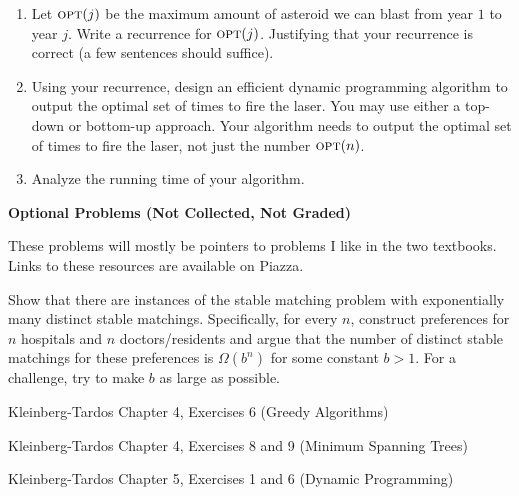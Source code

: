 \documentclass[11pt]{article}
\theoremstyle{definition}
\begin{document}
\begin{enumerate}[leftmargin=0pt, itemsep=3ex]
\begin{enumerate}[leftmargin=0pt, itemsep=3ex]
    \item Let $\textsc{opt}(j)$ be the maximum amount of asteroid we can blast from year $1$ to year $j$.  Write a recurrence for $\textsc{opt}(j)$. Justifying that your recurrence is correct (a few sentences should suffice).

    \item Using your recurrence, design an efficient dynamic programming algorithm to output the optimal set of times to fire the laser.  You may use either a top-down or bottom-up approach.  Your algorithm needs to output the optimal set of times to fire the laser, not just the number $\textsc{opt}(n)$.

    \item Analyze the running time of your algorithm.
    \end{enumerate}
\end{enumerate}

\noindent\textbf{\color{red} \Large Optional Problems (Not Collected, Not Graded)}

\medskip
\noindent These problems will mostly be pointers to problems I like in the two textbooks.  Links to these resources are available on Piazza.

\begin{enumerate}[leftmargin=0pt, itemsep=3ex]
\problemitem Show that there are instances of the stable matching problem with exponentially many distinct stable matchings.  Specifically, for every $n$, construct preferences for $n$ hospitals and $n$ doctors/residents and argue that the number of distinct stable matchings for these preferences is $\Omega(b^n)$ for some constant $b > 1$.  For a challenge, try to make $b$ as large as possible.

\problemitem Kleinberg-Tardos Chapter 4, Exercises 6 (Greedy Algorithms)

\problemitem Kleinberg-Tardos Chapter 4, Exercises 8 and 9 (Minimum Spanning Trees)

\problemitem Kleinberg-Tardos Chapter 5, Exercises 1 and 6 (Dynamic Programming)
\end{enumerate}
\end{document}
